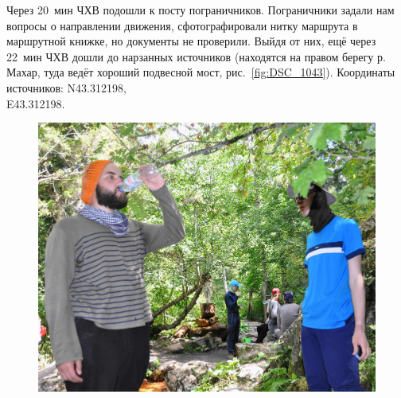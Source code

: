 Через 20~мин ЧХВ подошли к посту пограничников. Пограничники задали нам вопросы о направлении движения, сфотографировали нитку маршрута в маршрутной книжке, но документы не проверили. Выйдя от них, ещё через 22~мин ЧХВ дошли до нарзанных источников (находятся на правом берегу р. Махар, туда ведёт хороший подвесной мост, рис.~\ref{fig:DSC_1043}). Координаты источников: N43.312198\degree,\\E43.312198\degree.

\begin{figure}[h!]
	\centering
	\begin{minipage}[h]{0.62\linewidth}
		\includegraphics[width=\linewidth]{../pics/DSC_1043.jpg}
	\end{minipage}
	\quad
	\begin{minipage}[h]{0.35\linewidth}

\end{minipage}
\end{figure}
